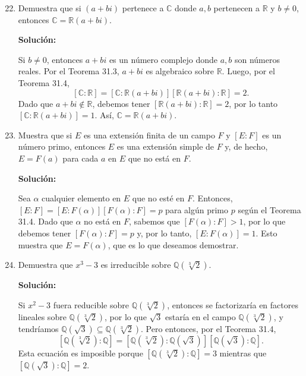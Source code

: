 \begin{enumerate}
\setcounter{enumi}{21}
    \item Demuestra que si $(a + bi)$ pertenece a $\mathbb{C}$ donde $a, b$ pertenecen a $\mathbb{R}$ y $b \neq 0$, entonces $\mathbb{C} = \mathbb{R}(a + bi)$.
    
    \textbf{Solución:}
    
    Si $b \neq 0$, entonces $a + bi$ es un número complejo donde $a, b$ son números reales. Por el Teorema 31.3, $a + bi$ es algebraico sobre $\mathbb{R}$. Luego, por el Teorema 31.4,
    \[ [\mathbb{C} : \mathbb{R}] = [\mathbb{C} : \mathbb{R}(a+bi)][\mathbb{R}(a+bi) : \mathbb{R}] = 2. \]
    Dado que $a+bi \notin \mathbb{R}$, debemos tener $[\mathbb{R}(a+bi) : \mathbb{R}] = 2$, por lo tanto $[\mathbb{C} : \mathbb{R}(a+bi)] = 1$. Así, $\mathbb{C} = \mathbb{R}(a+bi)$.
    
    \item Muestra que si $E$ es una extensión finita de un campo $F$ y $[E : F]$ es un número primo, entonces $E$ es una extensión simple de $F$ y, de hecho, $E = F(a)$ para cada $a$ en $E$ que no está en $F$.
    
    \textbf{Solución:}
    
    Sea $\alpha$ cualquier elemento en $E$ que no esté en $F$. Entonces, $[E:F] = [E:F(\alpha)][F(\alpha):F] = p$ para algún primo $p$ según el Teorema 31.4. Dado que $\alpha$ no está en $F$, sabemos que $[F(\alpha) : F] > 1$, por lo que debemos tener $[F(\alpha) : F] = p$ y, por lo tanto, $[E : F(\alpha)] = 1$. Esto muestra que $E = F(\alpha)$, que es lo que deseamos demostrar.
    
    \item Demuestra que $x^3 - 3$ es irreducible sobre $\mathbb{Q}(\sqrt[3]{2})$. 
    
    \textbf{Solución:}
    
    Si $x^2 - 3$ fuera reducible sobre $\mathbb{Q}(\sqrt[3]{2})$, entonces se factorizaría en factores lineales sobre $\mathbb{Q}(\sqrt[3]{2})$, por lo que $\sqrt{3}$ estaría en el campo $\mathbb{Q}(\sqrt[3]{2})$, y tendríamos $\mathbb{Q}(\sqrt{3}) \subseteq \mathbb{Q}(\sqrt[3]{2})$. Pero entonces, por el Teorema 31.4,
    \[ [\mathbb{Q}(\sqrt[3]{2}) : \mathbb{Q}] = [\mathbb{Q}(\sqrt[3]{2}) : \mathbb{Q}(\sqrt{3})][\mathbb{Q}(\sqrt{3}) : \mathbb{Q}]. \]
    Esta ecuación es imposible porque $[\mathbb{Q}(\sqrt[3]{2}) : \mathbb{Q}] = 3$ mientras que $[\mathbb{Q}(\sqrt{3}) : \mathbb{Q}] = 2$.
\end{enumerate}



